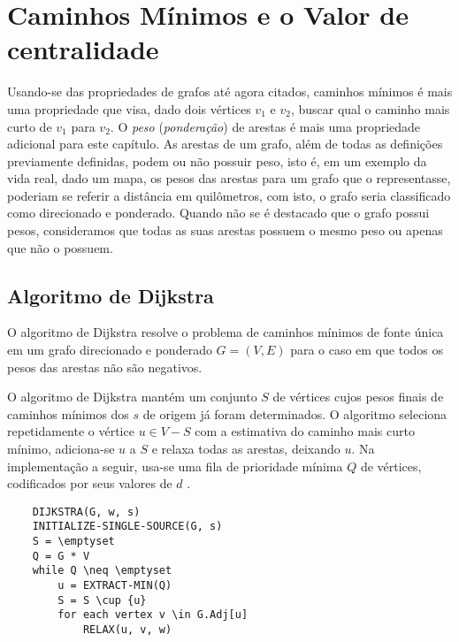 \graphicspath{{\currfiledir/images/}}

\chapter{Caminhos Mínimos e o Valor de centralidade}


Usando-se das propriedades de grafos até agora citados, caminhos mínimos é mais uma propriedade que visa, dado dois vértices $v_1$ e $v_2$, buscar qual o caminho mais curto de $v_1$ para $v_2$. O \emph{peso} (\emph{ponderação}) de arestas é mais uma propriedade adicional para este capítulo. As arestas de um grafo, além de todas as definições previamente definidas, podem ou não possuir peso, isto é, em um exemplo da vida real, dado um mapa, os pesos das arestas para um grafo que o representasse, poderiam se referir a distância em quilômetros, com isto, o grafo seria classificado como direcionado e ponderado. Quando não se é destacado que o grafo possui pesos, consideramos que todas as suas arestas possuem o mesmo peso ou apenas que não o possuem.


\section{Algoritmo de Dijkstra}
O algoritmo de Dijkstra resolve o problema de caminhos mínimos de fonte única em um grafo direcionado e ponderado $G = (V, E)$ para o caso em que todos os pesos das arestas não são negativos.

O algoritmo de Dijkstra mantém um conjunto $S$ de vértices cujos pesos finais de caminhos mínimos dos $s$ de origem já foram determinados. O algoritmo seleciona repetidamente o vértice $u \in V - S$ com a estimativa do caminho mais curto mínimo, adiciona-se $u$ a $S$ e relaxa todas as arestas, deixando $u$. Na implementação a seguir, usa-se uma fila de prioridade mínima $Q$ de vértices, codificados por seus valores de $d$ \cite{cormen2009}.

\begin{lstlisting}
	DIJKSTRA(G, w, s)
	INITIALIZE-SINGLE-SOURCE(G, s)
	S = \emptyset
	Q = G * V
	while Q \neq \emptyset
		u = EXTRACT-MIN(Q)
		S = S \cup {u}
		for each vertex v \in G.Adj[u]
			RELAX(u, v, w)
\end{lstlisting}

